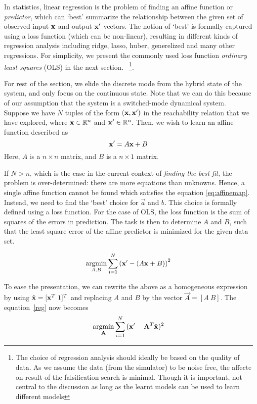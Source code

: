 In statistics, linear regression is the problem of finding an affine
function or \textit{predictor}, which can `best' summarize the
relationship between the given set of observed input $\mathbf{x}$ and output
$\mathbf{x}'$ vectors. The notion of `best' is formally captured using a loss
function (which can be non-linear), resulting in different kinds of
regression analysis including ridge, lasso, huber, generelized and
many other regressions. For simplicity, we present the commonly used
loss function \textit{ordinary least squares} (OLS) in the next
section.
~\footnote{The choice of regression analysis should ideally be based on the
quality of data. As we assume the data (from the simulator) to be
noise free, the affecte on result of the falsification search is
minimal.
Though it is important,  not central to the
discussion as long as the learnt models  can be used to learn different
models}.

For rest of the section, we elide the discrete mode from the hybrid
state of the system, and only focus on the continuous state. Note that
we can do this because of our assumption that the system is a
switched-mode dynamical system.  Suppose we have $N$ tuples of the
form $(\mathbf{x},\mathbf{x}')$ in the reachability relation that we have explored,
where $\mathbf{x}\in\mathbb{R}^n$ and $\mathbf{x}'\in\mathbb{R}^n$. Then, we wish to learn an
affine function described as
\begin{equation}
\label{eq:affinemap}
\mathbf{x}' = A\mathbf{x} + B
\end{equation}
Here, $A$ is a $n\times n$ matrix, and $B$ is a $n\times 1$ matrix.


If $N>n$, which is the case in the current context of \textit{finding
the best fit}, the problem is over-determined: there are more
equations than unknowns. Hence, a single affine function cannot be
found which satisfies the equation \eqref{eq:affinemap}. Instead, we
need to find the `best' choice for $\vec{a}$ and $b$. This choice is
formally defined using a loss function. For the case of OLS, the loss
function is the sum of squares of the errors in prediction.  The task
is then to determine $A$ and $B$, such that the least square error of
the affine predictor is minimized for the given data set.

\begin{equation}
    \operatornamewithlimits{argmin}_{A,B}\displaystyle\sum_{i=1}^{N}{\left(\x' - (A\x + B)\right)^2}
\label{reg}
\end{equation}

To ease the presentation, we can rewrite the above as a homogeneous
expression by using $\hat{\x} = [\x^T\ 1]^T$ and replacing $A$ and $B$ by the vector
$\vec{A} = [A\ B]$. The equation~\ref{reg} now becomes
\[
\operatornamewithlimits{argmin}_{\vec{A}}\displaystyle\sum_{i=1}^{N}{(\x' - \vec{A}^T \hat{\x})^2}
\]

